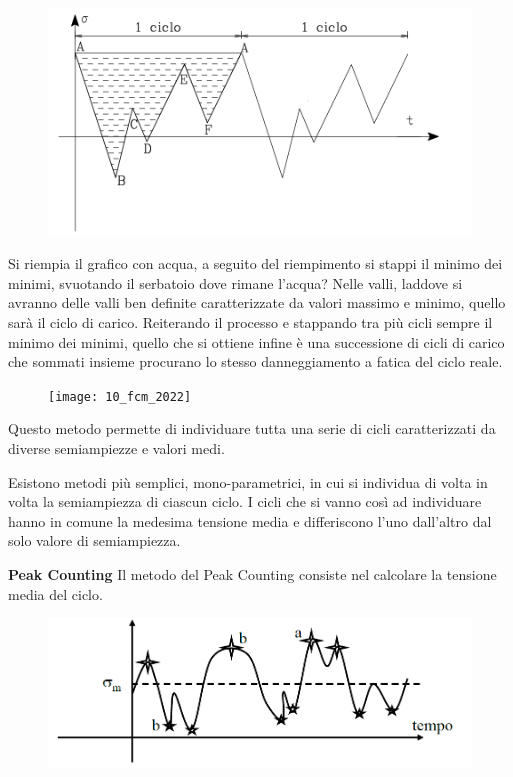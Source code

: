 		 \begin{figure}[H]
		 	\centering
		 	\includegraphics[width=0.5\linewidth]{immagini_10/screenshot014}
		 	\label{fig:screenshot014}
		 \end{figure}
		 		  
		 Si riempia il grafico con acqua, a seguito del riempimento si stappi il minimo dei minimi, svuotando il serbatoio dove rimane l'acqua? Nelle valli, laddove si avranno delle valli ben definite caratterizzate da valori massimo e minimo, quello sarà il ciclo di carico. Reiterando il processo e stappando tra più cicli sempre il minimo dei minimi, quello che si ottiene infine è una successione di cicli di carico che sommati insieme procurano lo stesso danneggiamento a fatica del ciclo reale.
		 

		 \begin{figure}[H]
		 \texttt{[image: 10\_fcm\_2022]}
		 \end{figure}
		 
		 Questo metodo permette di individuare tutta una serie di cicli caratterizzati da diverse semiampiezze e valori medi. 
		  
		 Esistono metodi più semplici, mono-parametrici, in cui si individua di volta in volta la semiampiezza di ciascun ciclo. I cicli che si vanno così ad individuare hanno in comune la medesima tensione media e differiscono l'uno dall'altro dal solo valore di semiampiezza. \newline
		 
		 \textbf{Peak Counting}\newline
		  Il metodo del Peak Counting consiste nel calcolare la tensione media del ciclo.
		  
		  \begin{figure}[H]
		  	\centering
		  	\includegraphics[width=0.5\linewidth]{immagini_10/screenshot015}
		  	\label{fig:screenshot015}
		  \end{figure}
		  
